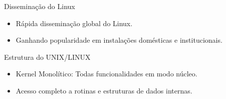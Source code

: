 \documentclass{beamer}
\begin{document}
\begin{frame}{Disseminação do Linux}
    \begin{itemize}
        \item Rápida disseminação global do Linux.
        \item Ganhando popularidade em instalações domésticas e institucionais.
    \end{itemize}
\end{frame}
\begin{frame}{Estrutura do UNIX/LINUX}
    \begin{itemize}
        \item Kernel Monolítico: Todas funcionalidades em modo núcleo.
        \item Acesso completo a rotinas e estruturas de dados internas.
    \end{itemize}
\end{frame}
\end{document}
